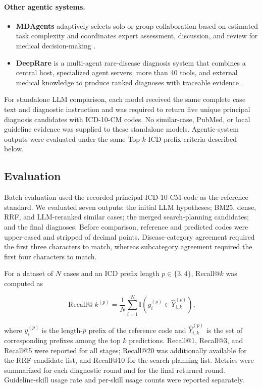 \documentclass[10pt,letterpaper]{article}
\begin{document}
\paragraph{Other agentic systems.}
\begin{itemize}
  \item \textbf{MDAgents} adaptively selects solo or group collaboration based
  on estimated task complexity and coordinates expert assessment, discussion,
  and review for medical decision-making \cite{kim2024mdagents}.
  \item \textbf{DeepRare} is a multi-agent rare-disease diagnosis system that
  combines a central host, specialized agent servers, more than 40 tools, and
  external medical knowledge to produce ranked diagnoses with traceable
  evidence \cite{zhao2025deeprare}.
\end{itemize}

For standalone LLM comparison, each model received the same complete case text
and diagnostic instruction and was required to return five unique principal
diagnosis candidates with ICD-10-CM codes. No similar-case, PubMed, or local
guideline evidence was supplied to these standalone models. Agentic-system
outputs were evaluated under the same Top-$k$ ICD-prefix criteria described
below.

\subsection{Evaluation}

Batch evaluation used the recorded principal ICD-10-CM code as the reference
standard. We evaluated seven outputs: the initial LLM hypotheses; BM25, dense,
RRF, and LLM-reranked similar cases; the merged search-planning candidates; and
the final diagnoses. Before comparison, reference and predicted codes were
upper-cased and stripped of decimal points. Disease-category agreement required
the first three characters to match, whereas subcategory agreement required the
first four characters to match.

For a dataset of $N$ cases and an ICD prefix length $p\in\{3,4\}$, Recall@$k$
was computed as

\begin{equation}
  \operatorname{Recall@}k^{(p)} = \frac{1}{N}\sum_{i=1}^{N}
  \mathbb{I}\!\left(y_i^{(p)} \in \widehat{Y}_{i,k}^{(p)}\right),
\end{equation}

where $y_i^{(p)}$ is the length-$p$ prefix of the reference code and
$\widehat{Y}_{i,k}^{(p)}$ is the set of corresponding prefixes among the top $k$
predictions. Recall@1, Recall@3, and Recall@5 were reported for all stages;
Recall@20 was additionally available for the RRF candidate list, and Recall@10
for the search-planning list. Metrics were summarized for each diagnostic round
and for the final returned round. Guideline-skill usage rate and per-skill usage
counts were reported separately.
\end{document}
